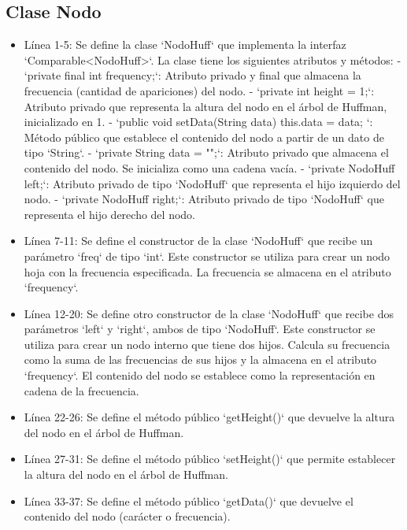 \documentclass{article}
\begin{document}
	\subsection{Clase Nodo}
		
	\begin{itemize}
		
\item Línea 1-5: Se define la clase `NodoHuff` que implementa la interfaz `Comparable<NodoHuff>`. La clase tiene los siguientes atributos y métodos:
   - `private final int frequency;`: Atributo privado y final que almacena la frecuencia (cantidad de apariciones) del nodo.
   - `private int height = 1;`: Atributo privado que representa la altura del nodo en el árbol de Huffman, inicializado en 1.
   - `public void setData(String data) { this.data = data; }`: Método público que establece el contenido del nodo a partir de un dato de tipo `String`.
   - `private String data = "";`: Atributo privado que almacena el contenido del nodo. Se inicializa como una cadena vacía.
   - `private NodoHuff left;`: Atributo privado de tipo `NodoHuff` que representa el hijo izquierdo del nodo.
   - `private NodoHuff right;`: Atributo privado de tipo `NodoHuff` que representa el hijo derecho del nodo.

\item Línea 7-11: Se define el constructor de la clase `NodoHuff` que recibe un parámetro `freq` de tipo `int`. Este constructor se utiliza para crear un nodo hoja con la frecuencia especificada. La frecuencia se almacena en el atributo `frequency`.

\item Línea 12-20: Se define otro constructor de la clase `NodoHuff` que recibe dos parámetros `left` y `right`, ambos de tipo `NodoHuff`. Este constructor se utiliza para crear un nodo interno que tiene dos hijos. Calcula su frecuencia como la suma de las frecuencias de sus hijos y la almacena en el atributo `frequency`. El contenido del nodo se establece como la representación en cadena de la frecuencia.

\item Línea 22-26: Se define el método público `getHeight()` que devuelve la altura del nodo en el árbol de Huffman.

\item Línea 27-31: Se define el método público `setHeight()` que permite establecer la altura del nodo en el árbol de Huffman.

\item Línea 33-37: Se define el método público `getData()` que devuelve el contenido del nodo (carácter o frecuencia).


\end{itemize}
\end{document}
